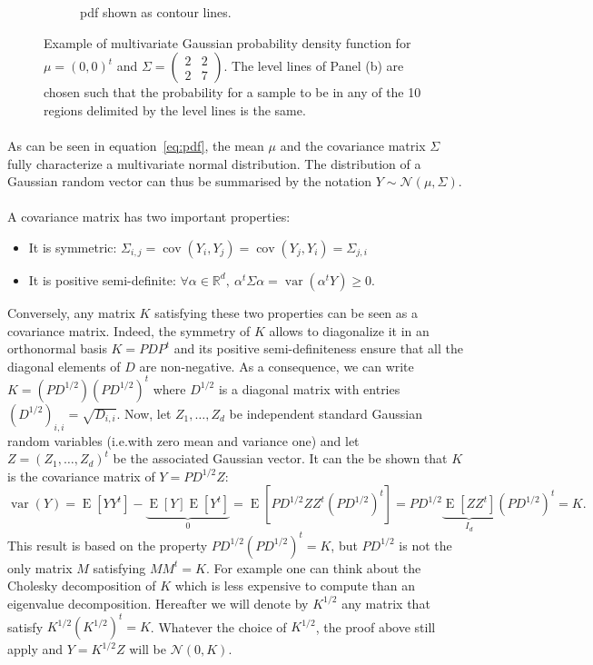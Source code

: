 \documentclass[twoside,openright]{report}
\DeclareMathOperator*{\Var}{var}
\DeclareMathOperator*{\E}{E}
\DeclareMathOperator*{\Cov}{cov}
\begin{document}
\begin{figure}[ht!]
\begin{subfigure}[b]{0.34\textwidth}
                \caption{pdf shown as contour lines.}
        \end{subfigure}
        \caption[Example of multivariate Gaussian probability density function]{Example of multivariate Gaussian probability density function for $\mu = (0,0)^t$ and $\Sigma =  \left( \begin{smallmatrix} 2&2 \\ 2&7 \end{smallmatrix} \right)$. The level lines of Panel (b) are chosen such that the probability for a sample to be in any of the 10 regions delimited by the level lines is the same.}
        \label{fig:vecpdf}
\end{figure}

\paragraph{}
As can be seen in equation~\ref{eq:pdf}, the mean $\mu$ and the covariance matrix $\Sigma$ fully characterize a multivariate normal distribution. The distribution of a Gaussian random vector can thus be summarised by the notation $Y \sim \mathcal{N}(\mu,\Sigma)$. 

\paragraph{}
A covariance matrix has two important properties:
\begin{itemize}
 	\item It is symmetric: $\Sigma_{i,j} = \Cov(Y_i,Y_j) = \Cov(Y_j,Y_i) = \Sigma_{j,i}$
 	\item It is positive semi-definite: $\forall \alpha \in \mathds{R}^d,\ \alpha^t \Sigma \alpha = \Var(\alpha^t Y) \geq 0$.
 \end{itemize} 
Conversely, any matrix $K$ satisfying these two properties can be seen as a covariance matrix. Indeed, the symmetry of $K$ allows to diagonalize it in an orthonormal basis $K=PDP^t$ and its positive semi-definiteness ensure that all the diagonal elements of $D$ are non-negative. As a consequence, we can write $K=(PD^{1/2})(PD^{1/2})^t$ where $D^{1/2}$ is a diagonal matrix with entries $(D^{1/2})_{i,i}=\sqrt{D_{i,i}}$. Now, let $Z_1, \dots, Z_d$ be independent standard Gaussian random variables (i.e.\@ with zero mean and variance one) and let $Z=(Z_1, \dots, Z_d)^t$ be the associated Gaussian vector. It can the be shown that $K$ is the covariance matrix of $Y=PD^{1/2}Z$:
\begin{equation}
        \Var(Y) = \E[YY^t] - \underbrace{\E[Y]\E[Y^t]}_0 =  \E[PD^{1/2}Z Z^t(PD^{1/2})^t] = PD^{1/2} \underbrace{\E[Z Z^t]}_{I_d} (PD^{1/2})^t = K.
\end{equation}
This result is based on the property $PD^{1/2} (PD^{1/2})^t = K$, but $PD^{1/2}$ is not the only matrix $M$ satisfying $MM^t = K$. For example one can think about the Cholesky decomposition of $K$ which is less expensive to compute than an eigenvalue decomposition. Hereafter we will denote by $K^{1/2}$ any matrix that satisfy $K^{1/2} (K^{1/2})^t = K$. Whatever the choice of $K^{1/2}$, the proof above still apply and $Y=K^{1/2}Z$ will be $\mathcal{N}(0,K)$.
\end{document}

